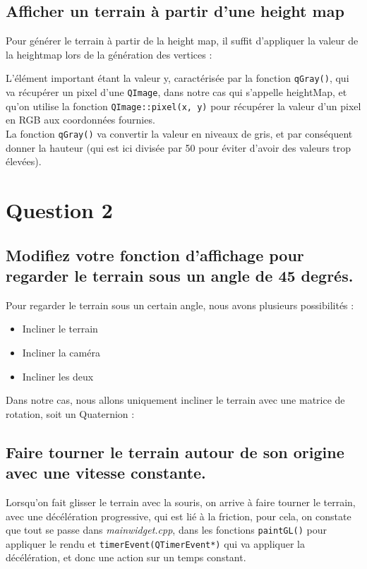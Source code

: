 \documentclass[a4paper,11pt]{report}
\begin{document}
    \subsection{Afficher un terrain à partir d'une height map}
    Pour générer le terrain à partir de la height map, il suffit d'appliquer la valeur de la heightmap lors de la génération des vertices :
        
	L'élément important étant la valeur y, caractérisée par la fonction \texttt{qGray()}, qui va récupérer un pixel d'une \texttt{QImage}, dans notre cas qui s'appelle heightMap, et qu'on utilise la fonction \texttt{QImage::pixel(x, y)} pour récupérer la valeur d'un pixel en RGB aux coordonnées fournies.\\
	La fonction \texttt{qGray()} va convertir la valeur en niveaux de gris, et par conséquent donner la hauteur (qui est ici divisée par 50 pour éviter d'avoir des valeurs trop élevées).
	
	\pagebreak
	\section{Question 2}
	\subsection{Modifiez votre fonction d'affichage pour regarder le terrain sous un angle de 45 degrés.}
		Pour regarder le terrain sous un certain angle, nous avons plusieurs possibilités :
		\begin{itemize}
			\item Incliner le terrain
			\item Incliner la caméra
			\item Incliner les deux
		\end{itemize}
		
		Dans notre cas, nous allons uniquement incliner le terrain avec une matrice de rotation, soit un Quaternion :
		
		
	\subsection{Faire tourner le terrain autour de son origine avec une vitesse constante.}
		Lorsqu'on fait glisser le terrain avec la souris, on arrive à faire tourner le terrain, avec une décélération progressive, qui est lié à la friction, pour cela, on constate que tout se passe dans \textit{mainwidget.cpp}, dans les fonctions \texttt{paintGL()} pour appliquer le rendu et \texttt{timerEvent(QTimerEvent*)} qui va appliquer la décélération, et donc une action sur un temps constant.    
    
\end{document}
